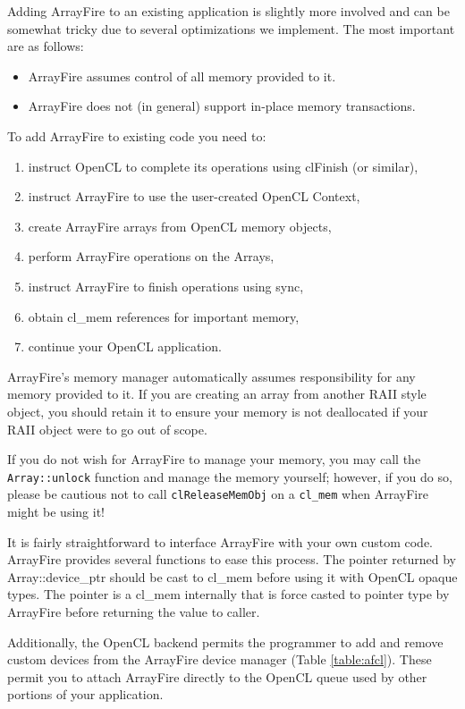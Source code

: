 Adding ArrayFire to an existing application is slightly more involved and can be somewhat tricky due to several optimizations we implement. The most important are as follows:

\begin{itemize}
\item ArrayFire assumes control of all memory provided to it.
\item ArrayFire does not (in general) support in-place memory transactions.
\end{itemize}

To add ArrayFire to existing code you need to:

\begin{enumerate}
\item instruct OpenCL to complete its operations using clFinish (or similar),
\item instruct ArrayFire to use the user-created OpenCL Context,
\item create ArrayFire arrays from OpenCL memory objects,
\item perform ArrayFire operations on the Arrays,
\item instruct ArrayFire to finish operations using sync,
\item obtain cl_mem references for important memory,
\item continue your OpenCL application.
\end{enumerate}
	
ArrayFire's memory manager automatically assumes responsibility for any memory provided to it. If you are creating an array from another RAII style object, you should retain it to ensure your memory is not deallocated if your RAII object were to go out of scope.

If you do not wish for ArrayFire to manage your memory, you may call the \texttt{Array::unlock} function and manage the memory yourself; however, if you do so, please be cautious not to call \texttt{clReleaseMemObj} on a \texttt{cl_mem} when ArrayFire might be using it!

It is fairly straightforward to interface ArrayFire with your own custom code. ArrayFire provides several functions to ease this process. The pointer returned by Array::device_ptr should be cast to cl_mem before using it with OpenCL opaque types. The pointer is a cl_mem internally that is force casted to pointer type by ArrayFire before returning the value to caller.

Additionally, the OpenCL backend permits the programmer to add and remove custom devices from the ArrayFire device manager (Table \ref{table:afcl}). These permit you to attach ArrayFire directly to the OpenCL queue used by other portions of your application.

